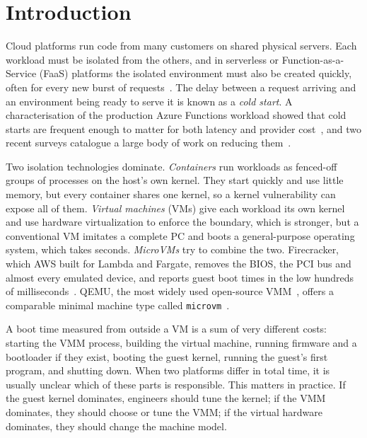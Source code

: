 \documentclass[pdflatex,sn-mathphys-num]{sn-jnl}%
\begin{document}

\maketitle

\section{Introduction}\label{sec:intro}

Cloud platforms run code from many customers on shared physical servers. Each workload must be isolated from the others, and in serverless or Function-as-a-Service (FaaS) platforms the isolated environment must also be created quickly, often for every new burst of requests~\cite{jonas2019berkeley}. The delay between a request arriving and an environment being ready to serve it is known as a \emph{cold start}. A characterisation of the production Azure Functions workload showed that cold starts are frequent enough to matter for both latency and provider cost~\cite{shahrad2020wild}, and two recent surveys catalogue a large body of work on reducing them~\cite{golec2024coldstart,ghorbian2024survey}.

Two isolation technologies dominate. \emph{Containers} run workloads as fenced-off groups of processes on the host's own kernel. They start quickly and use little memory, but every container shares one kernel, so a kernel vulnerability can expose all of them. \emph{Virtual machines} (VMs) give each workload its own kernel and use hardware virtualization to enforce the boundary, which is stronger, but a conventional VM imitates a complete PC and boots a general-purpose operating system, which takes seconds. \emph{MicroVMs} try to combine the two. Firecracker, which AWS built for Lambda and Fargate, removes the BIOS, the PCI bus and almost every emulated device, and reports guest boot times in the low hundreds of milliseconds~\cite{agache2020firecracker}. QEMU, the most widely used open-source VMM~\cite{bellard2005qemu}, offers a comparable minimal machine type called \texttt{microvm}~\cite{qemumicrovm}.

A boot time measured from outside a VM is a sum of very different costs: starting the VMM process, building the virtual machine, running firmware and a bootloader if they exist, booting the guest kernel, running the guest's first program, and shutting down. When two platforms differ in total time, it is usually unclear which of these parts is responsible. This matters in practice. If the guest kernel dominates, engineers should tune the kernel; if the VMM dominates, they should choose or tune the VMM; if the virtual hardware dominates, they should change the machine model.
\end{document}
